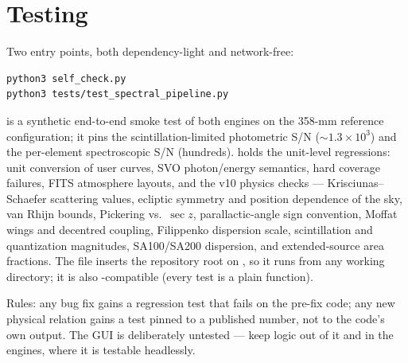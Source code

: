\section{Testing}

Two entry points, both dependency-light and network-free:

\begin{verbatim}
python3 self_check.py
python3 tests/test_spectral_pipeline.py
\end{verbatim}

 is a synthetic end-to-end smoke test of both engines
on the 358-mm reference configuration; it pins the scintillation-limited
photometric S/N ($\sim1.3\times10^3$) and the per-element spectroscopic S/N
(hundreds).  holds the unit-level
regressions: unit conversion of user curves, SVO photon/energy semantics,
hard coverage failures, FITS atmosphere layouts, and the v10 physics checks
--- Krisciunas--Schaefer scattering values, ecliptic symmetry and position
dependence of the sky, van Rhijn bounds, Pickering vs.\ $\sec z$,
parallactic-angle sign convention, Moffat wings and decentred coupling,
Filippenko dispersion scale, scintillation and quantization magnitudes,
SA100/SA200 dispersion, and extended-source area fractions. The file
inserts the repository root on , so it runs from any working
directory; it is also -compatible (every test is a plain
 function).

Rules: any bug fix gains a regression test that fails on the pre-fix code;
any new physical relation gains a test pinned to a published number, not to
the code's own output. The GUI is deliberately untested --- keep logic out
of it and in the engines, where it is testable headlessly.
